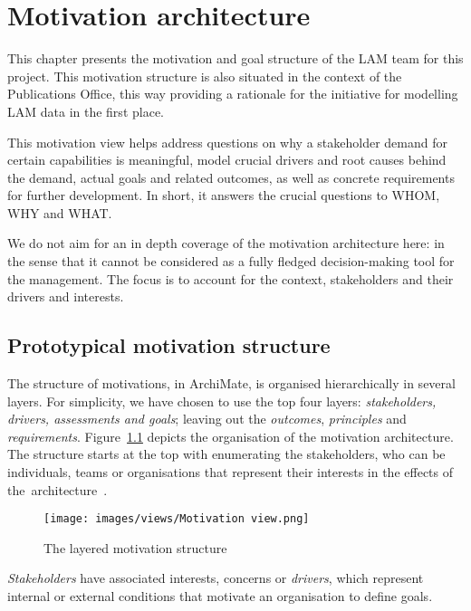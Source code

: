 \chapter{Motivation architecture}
\label{sec:motivation-architecture}

	This chapter presents the motivation and goal structure of the LAM team for this project. This motivation structure is also situated in the context of the Publications Office, this way providing a rationale for the initiative for modelling LAM data in the first place. 
		
	This motivation view helps address questions on why a stakeholder demand for certain capabilities is meaningful, model crucial drivers and root causes behind the demand, actual goals and related outcomes, as well as concrete requirements for further development. In short, it answers the crucial questions to WHOM, WHY and WHAT.
	
	We do not aim for an in depth coverage of the motivation architecture here: in the sense that it cannot be considered as a fully fledged decision-making tool for the management. The focus is to account for the context, stakeholders and their drivers and interests.
	
	\section{Prototypical motivation structure}
	\label{sec:how-to-motivation}		
	
	The structure of motivations, in ArchiMate, is organised hierarchically in several layers. For simplicity, we have chosen to use the top four layers: \textit{stakeholders, drivers, assessments and goals}; leaving out the \textit{outcomes}, \textit{principles} and \textit{requirements}. \mbox{Figure \ref{fig:morivation-structure}} depicts the organisation of the motivation architecture. The structure starts at the top with enumerating the stakeholders, who can be individuals, teams or organisations that represent their interests in the effects of \mbox{the architecture \citep{archimate3.1}}. 
	
	\begin{figure}[h]
		\centering
		\texttt{[image: images/views/Motivation view.png]}
		\caption{The layered motivation structure}
		\label{fig:morivation-structure}
	\end{figure}
	
	\textit{Stakeholders} have associated interests, concerns or \textit{drivers}, which represent internal or external conditions that motivate an organisation to define goals.
	
